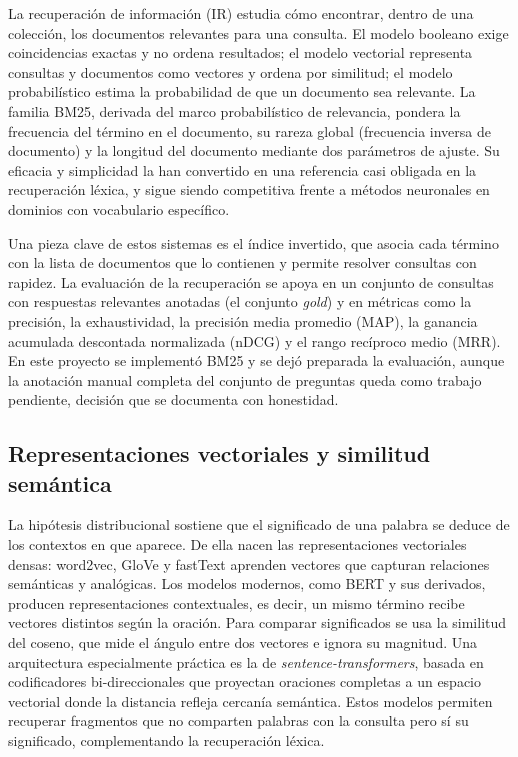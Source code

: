 \documentclass[12pt,a4paper]{article}
\begin{document}
La recuperación de información (IR) estudia cómo encontrar, dentro de una colección, los documentos relevantes para una consulta. El modelo booleano exige coincidencias exactas y no ordena resultados; el modelo vectorial representa consultas y documentos como vectores y ordena por similitud; el modelo probabilístico estima la probabilidad de que un documento sea relevante. La familia BM25, derivada del marco probabilístico de relevancia, pondera la frecuencia del término en el documento, su rareza global (frecuencia inversa de documento) y la longitud del documento mediante dos parámetros de ajuste. Su eficacia y simplicidad la han convertido en una referencia casi obligada en la recuperación léxica, y sigue siendo competitiva frente a métodos neuronales en dominios con vocabulario específico.

Una pieza clave de estos sistemas es el índice invertido, que asocia cada término con la lista de documentos que lo contienen y permite resolver consultas con rapidez. La evaluación de la recuperación se apoya en un conjunto de consultas con respuestas relevantes anotadas (el conjunto \emph{gold}) y en métricas como la precisión, la exhaustividad, la precisión media promedio (MAP), la ganancia acumulada descontada normalizada (nDCG) y el rango recíproco medio (MRR). En este proyecto se implementó BM25 y se dejó preparada la evaluación, aunque la anotación manual completa del conjunto de preguntas queda como trabajo pendiente, decisión que se documenta con honestidad.

\subsection{Representaciones vectoriales y similitud semántica}

La hipótesis distribucional sostiene que el significado de una palabra se deduce de los contextos en que aparece. De ella nacen las representaciones vectoriales densas: word2vec, GloVe y fastText aprenden vectores que capturan relaciones semánticas y analógicas. Los modelos modernos, como BERT y sus derivados, producen representaciones contextuales, es decir, un mismo término recibe vectores distintos según la oración. Para comparar significados se usa la similitud del coseno, que mide el ángulo entre dos vectores e ignora su magnitud. Una arquitectura especialmente práctica es la de \emph{sentence-transformers}, basada en codificadores bi-direccionales que proyectan oraciones completas a un espacio vectorial donde la distancia refleja cercanía semántica. Estos modelos permiten recuperar fragmentos que no comparten palabras con la consulta pero sí su significado, complementando la recuperación léxica.
\end{document}

